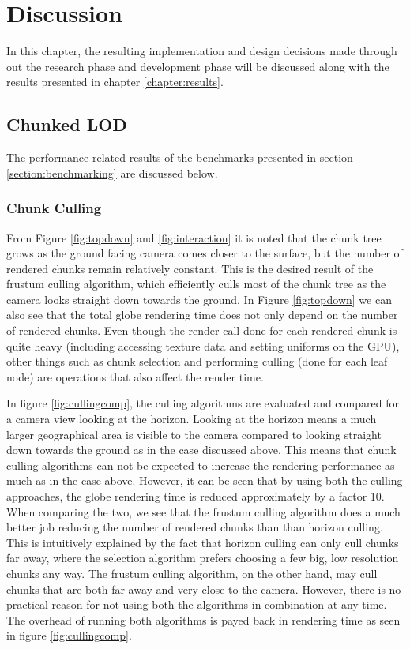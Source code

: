 \chapter{Discussion}
In this chapter, the resulting implementation and design decisions made through out the research phase and development phase will be discussed along with the results presented in chapter \ref{chapter:results}.

\section{Chunked LOD}
The performance related results of the benchmarks presented in section \ref{section:benchmarking} are discussed below.

\subsection{Chunk Culling}
From Figure \ref{fig:topdown} and \ref{fig:interaction} it is noted that the chunk tree grows as the ground facing camera comes closer to the surface, but the number of rendered chunks remain relatively constant. 
This is the desired result of the frustum culling algorithm, which efficiently culls most of the chunk tree as the camera looks straight down towards the ground. 
In Figure \ref{fig:topdown} we can also see that the total globe rendering time does not only depend on the number of rendered chunks. 
Even though the render call done for each rendered chunk is quite heavy (including accessing texture data and setting uniforms on the GPU), other things such as chunk selection and performing culling (done for each leaf node) are operations that also affect the render time. 

In figure \ref{fig:cullingcomp}, the culling algorithms are evaluated and compared for a camera view looking at the horizon. 
Looking at the horizon means a much larger geographical area is visible to the camera compared to looking straight down towards the ground as in the case discussed above. 
This means that chunk culling algorithms can not be expected to increase the rendering performance as much as in the case above. 
However, it can be seen that by using both the culling approaches, the globe rendering time is reduced approximately by a factor 10. 
When comparing the two, we see that the frustum culling algorithm does a much better job reducing the number of rendered chunks than than horizon culling. 
This is intuitively explained by the fact that horizon culling can only cull chunks far away, where the selection algorithm prefers choosing a few big, low resolution chunks any way. 
The frustum culling algorithm, on the other hand, may cull chunks that are both far away and very close to the camera. 
However, there is no practical reason for not using both the algorithms in combination at any time. 
The overhead of running both algorithms is payed back in rendering time as seen in figure \ref{fig:cullingcomp}.


